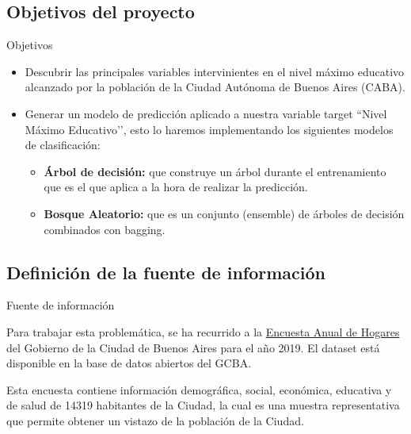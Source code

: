 \documentclass[pdf]{beamer}
\begin{document}


    \subsection{Objetivos del proyecto}

\begin{frame}{Objetivos}

    \begin{itemize}
        \item Descubrir las principales variables intervinientes en el nivel máximo educativo alcanzado por la población de la Ciudad Autónoma de Buenos Aires (CABA).
        \item Generar un modelo de predicción aplicado a nuestra variable target ``Nivel Máximo Educativo’’, esto lo haremos implementando los siguientes modelos de clasificación:
        \begin{itemize}
            \item \textbf{Árbol de decisión:} que construye un árbol durante el entrenamiento que es el que aplica a la hora de realizar la predicción.
            \item \textbf{Bosque Aleatorio:} que es un conjunto (ensemble) de árboles de decisión combinados con bagging.
        \end{itemize}
    \end{itemize}

\end{frame}

    \subsection{Definición de la fuente de información}

\begin{frame}{Fuente de información}

    Para trabajar esta problemática, se ha recurrido a la \href{https://data.buenosaires.gob.ar/dataset/encuesta-anual-hogares/resource/3a45c563-396d-42de-ba93-8a93729e0723}{Encuesta Anual de Hogares} del Gobierno de la Ciudad de Buenos Aires para el año 2019. El dataset está disponible en la base de datos abiertos del GCBA.

    Esta encuesta contiene información demográfica, social, económica, educativa y de salud de 14319 habitantes de la Ciudad, la cual es una muestra representativa que permite obtener un vistazo de la población de la Ciudad.

\end{frame}
\end{document}
